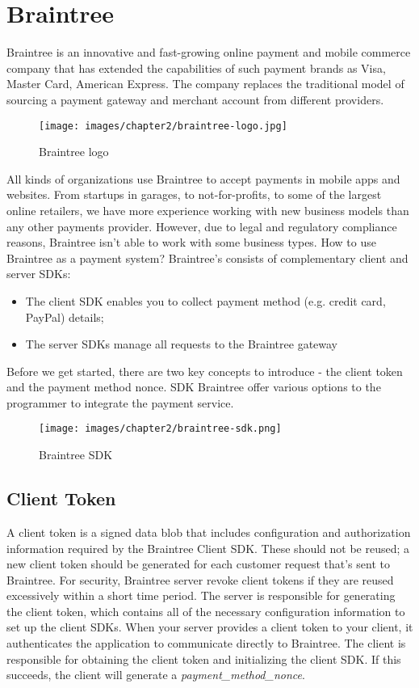 \section{Braintree}
\label{sec:braintree}
Braintree is an innovative and fast-growing online payment and mobile commerce company that has extended the capabilities of such payment brands as Visa, Master Card, American Express.
The company replaces the traditional model of sourcing a payment gateway and merchant account from different providers.
\begin{figure}[htb]
\centering
\texttt{[image: images/chapter2/braintree-logo.jpg]}\hfill
\caption[Braintree logo]{Braintree logo}
\label{fig:stripe_logo}
\end{figure}
All kinds of organizations use Braintree to accept payments in mobile apps and websites. From startups in garages, to not-for-profits, to some of the largest online retailers, we have more experience working with new business models than any other payments provider. However, due to legal and regulatory compliance reasons, Braintree isn't able to work with some business types. How to use Braintree as a payment system?
Braintree's  consists of complementary client and server SDKs:
\begin{itemize}
\item The client SDK enables you to collect payment method (e.g. credit card, PayPal) details;
\item The server SDKs manage all requests to the Braintree gateway
\end{itemize}
Before we get started, there are two key concepts to introduce - the client token and the payment method nonce.
\newline
SDK Braintree offer various options to the programmer to integrate the payment service.
\begin{figure}[htb]
\centering
\texttt{[image: images/chapter2/braintree-sdk.png]}\hfill
\caption[Braintree SDK]{Braintree SDK}
\label{fig:braintree_sdk}
\end{figure}
\subsection{Client Token}
A client token is a signed data blob that includes configuration and authorization information required by the Braintree Client SDK. These should not be reused; a new client token should be generated for each customer request that's sent to Braintree. For security, Braintree server revoke client tokens if they are reused excessively within a short time period.
The server is responsible for generating the client token, which contains all of the necessary configuration information to set up the client SDKs. When your server provides a client token to your client, it authenticates the application to communicate directly to Braintree.
The client is responsible for obtaining the client token and initializing the client SDK. If this succeeds, the client will generate a \emph{payment\_method\_nonce}.
